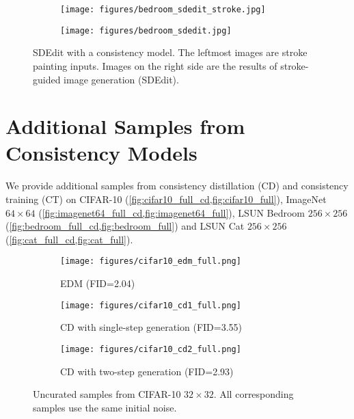 \begin{appendices}
\begin{figure}
    \centering
    \begin{subfigure}[b]{0.11\textwidth}
        \texttt{[image: figures/bedroom\_sdedit\_stroke.jpg]}
    \end{subfigure}\hfill
    \begin{subfigure}[b]{0.88\textwidth}
        \texttt{[image: figures/bedroom\_sdedit.jpg]}
    \end{subfigure}
    \caption{SDEdit with a consistency model. The leftmost images are stroke painting inputs. Images on the right side are the results of stroke-guided image generation (SDEdit).}
    \label{fig:bedroom_sdedit}
\end{figure}

\section{Additional Samples from Consistency Models}\label{app:samples}

We provide additional samples from consistency distillation (CD) and consistency training (CT) on CIFAR-10 (\cref{fig:cifar10_full_cd,fig:cifar10_full}), ImageNet $64\times 64$ (\cref{fig:imagenet64_full_cd,fig:imagenet64_full}), LSUN Bedroom $256\times 256$ (\cref{fig:bedroom_full_cd,fig:bedroom_full}) and LSUN Cat $256\times 256$ (\cref{fig:cat_full_cd,fig:cat_full}).

\begin{figure}
    \centering
    \begin{subfigure}[b]{\textwidth}
        \texttt{[image: figures/cifar10\_edm\_full.png]}
        \caption{EDM (FID=2.04)}
    \end{subfigure}
    \begin{subfigure}[b]{\textwidth}
        \texttt{[image: figures/cifar10\_cd1\_full.png]}
        \caption{CD with single-step generation (FID=3.55)}
    \end{subfigure}
    \begin{subfigure}[b]{\textwidth}
        \texttt{[image: figures/cifar10\_cd2\_full.png]}
        \caption{CD with two-step generation (FID=2.93)}
    \end{subfigure}
    \caption{Uncurated samples from CIFAR-10 $32\times 32$. All corresponding samples use the same initial noise.}
    \label{fig:cifar10_full_cd}
\end{figure}


\end{appendices}
